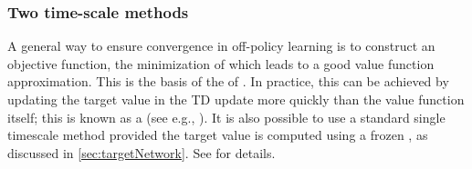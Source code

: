 
\subsubsection{Two time-scale methods}

A general way to ensure convergence in off-policy
learning is to construct an objective function,
the minimization of which leads to a good value function approximation.
This is the basis of the
 of \citep{Sutton2008,Maei2009,Ghiassian2020}.
In practice, this can be achieved by  updating the target value in the TD update
more quickly than the value function itself;
this is known as a 
(see e.g., \citep{Yu2017TD,Zhang2019timescale,Hong2023}).
It is also possible to use a standard single timescale
method provided the target value is computed using a 
frozen ,
as discussed in \cref{sec:targetNetwork}.
See \citep{Fellows2023,Che2024} for details.


